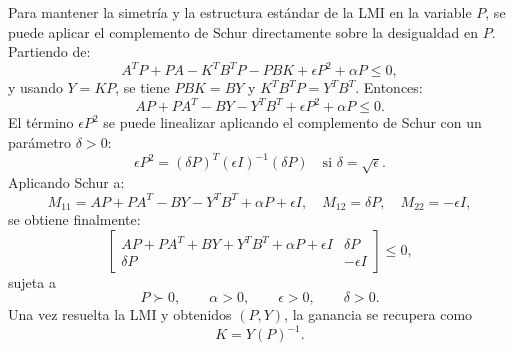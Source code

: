 \begin{itemize}
Para mantener la simetría y la estructura estándar de la LMI en la variable \(P\), se puede aplicar el complemento de Schur directamente sobre la desigualdad en \(P\). Partiendo de:
\begin{equation*}
    A^T P + P A - K^T B^T P - P B K + \epsilon P^2 + \alpha P \leq 0,
\end{equation*}
y usando \(Y = KP\), se tiene \(P B K = B Y\) y \(K^T B^T P = Y^T B^T\). Entonces:
\begin{equation*}
    A P + P A^T - B Y - Y^T B^T + \epsilon P^2 + \alpha P \leq 0.
\end{equation*}
El término \(\epsilon P^2\) se puede linealizar aplicando el complemento de Schur con un parámetro \(\delta > 0\):
\begin{equation*}
    \epsilon P^2 = (\delta P)^T (\epsilon I)^{-1} (\delta P) \quad \text{si } \delta = \sqrt{\epsilon}.
\end{equation*}
Aplicando Schur a:
\begin{equation*}
    M_{11} = A P + P A^T - B Y - Y^T B^T + \alpha P + \epsilon I, \quad
    M_{12} = \delta P, \quad
    M_{22} = -\epsilon I,
\end{equation*}
se obtiene finalmente:
\begin{equation*}
    \begin{bmatrix}
        A P + P A^T + B Y + Y^T B^T + \alpha P + \epsilon I & \delta P \\
        \delta P & -\epsilon I
    \end{bmatrix} \leq 0,
\end{equation*}
sujeta a
\begin{equation*}
    P \succ 0, \qquad \alpha > 0, \qquad \epsilon > 0, \qquad \delta > 0.
\end{equation*}
Una vez resuelta la LMI y obtenidos \((P, Y)\), la ganancia se recupera como
\begin{equation*}
    K = Y (P)^{-1}.
\end{equation*}


\end{itemize}
